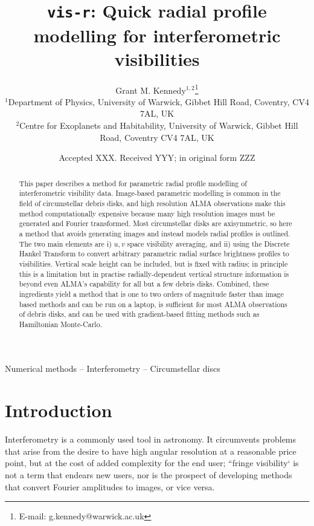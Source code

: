 \documentclass[fleqn,usenatbib]{mnras}
\title[vis-r]{\texttt{vis-r}: Quick radial profile modelling for interferometric visibilities}
\author[G. M. Kennedy]{
Grant M. Kennedy$^{1,2}$\thanks{E-mail: g.kennedy@warwick.ac.uk}
\\
$^{1}$Department of Physics, University of Warwick, Gibbet Hill Road, Coventry, CV4 7AL, UK\\
$^{2}$Centre for Exoplanets and Habitability, University of Warwick, Gibbet Hill Road, Coventry CV4 7AL, UK\\
}
\date{Accepted XXX. Received YYY; in original form ZZZ}
\begin{document}
\label{firstpage}
\pagerange{\pageref{firstpage}--\pageref{lastpage}}
\maketitle

\begin{abstract}
This paper describes a method for parametric radial profile modelling of interferometric visibility data. Image-based parametric modelling is common in the field of circumstellar debris disks, and high resolution ALMA observations make this method computationally expensive because many high resolution images must be generated and Fourier transformed. Most circumstellar disks are axisymmetric, so here a method that avoids generating images and instead models radial profiles is outlined. The two main elements are i) $u,v$ space visibility averaging, and ii) using the Discrete Hankel Transform to convert arbitrary parametric radial surface brightness profiles to visibilities. Vertical scale height can be included, but is fixed with radius; in principle this is a limitation but in practise radially-dependent vertical structure information is beyond even ALMA's capability for all but a few debris disks. Combined, these ingredients yield a method that is one to two orders of magnitude faster than image based methods and can be run on a laptop, is sufficient for most ALMA observations of debris disks, and can be used with gradient-based fitting methods such as Hamiltonian Monte-Carlo.
\end{abstract}

\begin{keywords}
Numerical methods -- Interferometry -- Circumstellar discs
\end{keywords}



\section{Introduction}

Interferometry is a commonly used tool in astronomy. It circumvents problems that arise from the desire to have high angular resolution at a reasonable price point, but at the cost of added complexity for the end user; ``fringe visibility` is not a term that endears new users, nor is the prospect of developing methods that convert Fourier amplitudes to images, or vice versa.
\end{document}
